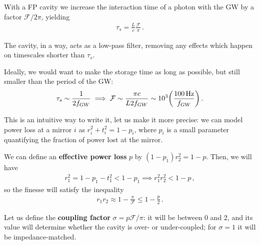 \documentclass[main.tex]{subfiles}
\begin{document}



With a FP cavity we increase the interaction time of a photon with the GW by a factor \(\mathcal{F} / 2 \pi \), yielding  
%
\begin{align}
\tau_{s} = \frac{L}{c} \frac{\mathcal{F}}{\pi }
\,.
\end{align}

The cavity, in a way, acts as a low-pass filter, removing any effects which happen on timescales shorter than \(\tau_{s}\).

Ideally, we would want to make the storage time as long as possible, but still smaller than the period of the GW: 
%
\begin{align}
\tau_{s} \sim \frac{1}{2 f_{GW}} 
\implies
\mathcal{F} \sim \frac{\pi c }{L 2 f_{GW}} \sim \num{e3} \qty(\frac{\SI{100}{Hz}}{f_{GW}})
\,.
\end{align}

This is an intuitive way to write it, let us make it more precise: we can model power loss at a mirror \(i\) as \(r_i^2 + t_i^2 = 1 - p_i\), where \(p_i\) is a small parameter quantifying the fraction of power lost at the mirror.  

We can define an \textbf{effective power loss} \(p\) by \((1-p_1 ) r_2^2 = 1 - p\).
Then, we will have 
%
\begin{align}
r_1^2 = 1 - p_1 - t_1^2 < 1 - p_1 \implies r_1^2 r_2^2 < 1 - p
\,,
\end{align}
%
so the finesse will satisfy the inequality 
%
\begin{align}
r_1 r_2 \approx 1 - \frac{\pi}{\mathcal{F}} \leq 1- \frac{p}{2}
\,.
\end{align}

Let us define the \textbf{coupling factor} \(\sigma = p \mathcal{F} / \pi \): it will be between 0 and 2, and its value will determine whether the cavity is over- or under-coupled; for \(\sigma = 1 \) it will be impedance-matched.
\end{document}

